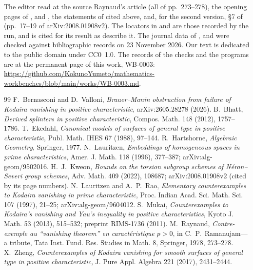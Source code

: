 \documentclass[11pt,a4paper]{article}
\theoremstyle{plain}
\theoremstyle{remark}
\newcommand{\workbenchurl}{https://github.com/KokunoYumeto/mathematics-workbenches/blob/main/works/WB-0003.md}
\begin{document}
The editor read at the source Raynaud's article \cite{Raynaud} (all of pp.~273--278), the opening pages of
\cite{LauritzenRao}, \cite{Mukai} and \cite{Ekedahl}, the statements of \cite{BV} cited above, and, for the second version, \S7 of \cite{Kweon} (pp.~17--19 of
arXiv:2008.01908v2). The locators in \cite{Bhatt} and \cite{Zheng} are those recorded by the run, and \cite{Lauritzen} is cited for its
result as \cite{LauritzenRao} describe it. The journal data of \cite{Lauritzen}, \cite{LauritzenRao} and \cite{Mukai} were
checked against bibliographic records on 23 November 2026. Our text is dedicated to the public domain under CC0~1.0. The records of the checks and the programs are at the
permanent page of this work, WB-0003: \url{\workbenchurl}.

\begin{thebibliography}{99}\small
{} F.~Bernasconi and D.~Valloni, \emph{Brauer--Manin obstruction from failure of Kodaira vanishing in positive
characteristic}, arXiv:2605.28278 (2026).
 B.~Bhatt, \emph{Derived splinters in positive characteristic}, Compos. Math. 148 (2012), 1757--1786.
 T.~Ekedahl, \emph{Canonical models of surfaces of general type in positive characteristic}, Publ. Math.
IHES 67 (1988), 97--144.
 R.~Hartshorne, \emph{Algebraic Geometry}, Springer, 1977.
 N.~Lauritzen, \emph{Embeddings of homogeneous spaces in prime characteristics}, Amer. J. Math. 118
(1996), 377--387; arXiv:alg-geom/9502016.
 H.~J.~Kweon, \emph{Bounds on the torsion subgroup schemes of N\'eron--Severi group schemes}, Adv. Math.
409 (2022), 108687; arXiv:2008.01908v2 (cited by its page numbers).
 N.~Lauritzen and A.~P.~Rao, \emph{Elementary counterexamples to Kodaira vanishing in prime
characteristic}, Proc. Indian Acad. Sci. Math. Sci. 107 (1997), 21--25; arXiv:alg-geom/9604012.
 S.~Mukai, \emph{Counterexamples to Kodaira's vanishing and Yau's inequality in positive
characteristics}, Kyoto J. Math. 53 (2013), 515--532; preprint RIMS-1736 (2011).
 M.~Raynaud, \emph{Contre-exemple au ``vanishing theorem'' en caract\'eristique $p>0$}, in
C.~P.~Ramanujam---a tribute, Tata Inst. Fund. Res. Studies in Math. 8, Springer, 1978, 273--278.
 X.~Zheng, \emph{Counterexamples of Kodaira vanishing for smooth surfaces of general type in positive
characteristic}, J. Pure Appl. Algebra 221 (2017), 2431--2444.
\end{thebibliography}
\end{document}
